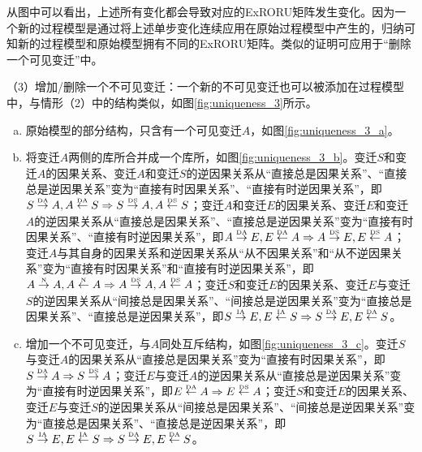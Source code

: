 从图中可以看出，上述所有变化都会导致对应的ExRORU矩阵发生变化。因为一个新的过程模型是通过将上述单步变化连续应用在原始过程模型中产生的，归纳可知新的过程模型和原始模型拥有不同的ExRORU矩阵。类似的证明可应用于“删除一个可见变迁”中。

{\heiti（3）增加/删除一个不可见变迁：}一个新的不可见变迁也可以被添加在过程模型中，与情形（2）中的结构类似，如图\ref{fig:uniqueness_3}所示。
\begin{enumerate}[(a)]
  \item 原始模型的部分结构，只含有一个可见变迁$A$，如图\ref{fig:uniqueness_3_a}。
  \item 将变迁$A$两侧的库所合并成一个库所，如图\ref{fig:uniqueness_3_b}。变迁$S$和变迁$A$的因果关系、变迁$A$和变迁$S$的逆因果关系从“直接总是因果关系”、“直接总是逆因果关系”变为“直接有时因果关系”、“直接有时逆因果关系”，即$S\overset{\text{\tiny{DA}}}{\rightarrow}A,A\overset{\text{\tiny{DA}}}{\leftarrow}S\Rightarrow S\overset{\text{\tiny{DS}}}{\rightarrow}A,A\overset{\text{\tiny{DS}}}{\leftarrow}S$；变迁$A$和变迁$E$的因果关系、变迁$E$和变迁$A$的逆因果关系从“直接总是因果关系”、“直接总是逆因果关系”变为“直接有时因果关系”、“直接有时逆因果关系”，即$A\overset{\text{\tiny{DA}}}{\rightarrow}E,E\overset{\text{\tiny{DA}}}{\leftarrow}A\Rightarrow A\overset{\text{\tiny{DS}}}{\rightarrow}E,E\overset{\text{\tiny{DS}}}{\leftarrow}A$；变迁$A$与其自身的因果关系和逆因果关系从“从不因果关系”和“从不逆因果关系”变为“直接有时因果关系”和“直接有时逆因果关系”，即$A\overset{\text{\tiny{N}}}{\rightarrow}A,A\overset{\text{\tiny{N}}}{\leftarrow}A\Rightarrow A\overset{\text{\tiny{DS}}}{\rightarrow}A,A\overset{\text{\tiny{DS}}}{\leftarrow}A$；变迁$S$和变迁$E$的因果关系、变迁$E$与变迁$S$的逆因果关系从“间接总是因果关系”、“间接总是逆因果关系”变为“直接总是因果关系”、“直接总是逆因果关系”，即$S\overset{\text{\tiny{IA}}}{\rightarrow}E,E\overset{\text{\tiny{IA}}}{\leftarrow}S\Rightarrow S\overset{\text{\tiny{DA}}}{\rightarrow}E,E\overset{\text{\tiny{DA}}}{\leftarrow}S$。
  \item 增加一个不可见变迁，与$A$同处互斥结构，如图\ref{fig:uniqueness_3_c}。变迁$S$与变迁$A$的因果关系从“直接总是因果关系”变为“直接有时因果关系”，即$S\overset{\text{\tiny{DA}}}{\rightarrow}A\Rightarrow S\overset{\text{\tiny{DS}}}{\rightarrow}A$；变迁$E$与变迁$A$的逆因果关系从“直接总是逆因果关系”变为“直接有时逆因果关系”，即$E\overset{\text{\tiny{DA}}}{\leftarrow}A\Rightarrow E\overset{\text{\tiny{DS}}}{\leftarrow}A$；变迁$S$和变迁$E$的因果关系、变迁$E$与变迁$S$的逆因果关系从“间接总是因果关系”、“间接总是逆因果关系”变为“直接总是因果关系”、“直接总是逆因果关系”，即$S\overset{\text{\tiny{IA}}}{\rightarrow}E,E\overset{\text{\tiny{IA}}}{\leftarrow}S\Rightarrow S\overset{\text{\tiny{DA}}}{\rightarrow}E,E\overset{\text{\tiny{DA}}}{\leftarrow}S$。

\end{enumerate}
